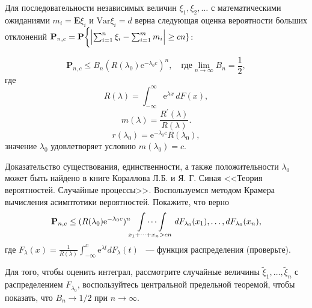 \begin{problem}
Для последовательности независимых величин $\xi_1,\xi_2,\dots$ с математическими ожиданиями $m_i = \mathbf{E} \xi_i$ и $\text{Var} \xi_i = d$ верна следующая оценка вероятности больших отклонений $\mathbf{P}_{n,c}= \mathbf{P}\biggl\{\Bigl|\sum_{i=1}^n\xi_i -\sum_{i=1}^m m_i\Bigr|\geq cn\}$: 

\begin{equation*}
\mathbf{P}_{n,c} \leq B_n(R(\lambda_0)\text{e}^{-\lambda_0c})^n,\quad\text{где} \lim_{n\to\infty}B_n=\frac{1}{2},
\end{equation*}
где 
\begin{equation*}
R(\lambda)=\int_{-\infty}^{\infty}\text{e}^{\lambda x}\,d F(x),
\end{equation*}
\begin{equation*}
m(\lambda) = \frac{R^{\prime}(\lambda)}{R(\lambda)}.
\end{equation*}
\begin{equation*}
r(\lambda_0) = \text{e}^{-\lambda_0 c}R(\lambda_0),
\end{equation*}
значение $\lambda_0$ удовлетворяет условию  $m(\lambda_0) = c$.
\end{problem}
\begin{remark}
Доказательство существования, единственности, а также положительности $\lambda_0$  может быть найдено в книге Кораллова Л.Б. и Я. Г. Синая <<Теория вероятностей. Случайные процессы>>. Воспользуемся методом Крамера вычисления асимптотики вероятностей. Покажите, что верно 
\begin{equation*}
\mathbf{P}_{n,c} \leq (R(\lambda_0)\text{e}^{-\lambda_0c})^n \idotsint\limits_{x_1+\dots+x_n>cn} \,dF_{\lambda_0}(x_1),\dots,dF_{\lambda_0}(x_n),
\end{equation*}
где $F_\lambda(x) = \frac{1}{R(\lambda)}\int_{-\infty}^{x} \text{e}^{\lambda t}d F_{\lambda}(t)$ ~--- функция распределения (проверьте).

Для того, чтобы оценить интеграл, рассмотрите случайные величины $\tilde{\xi}_1,\dots,\tilde{\xi}_n$ с распределением $F_{\lambda_0}$, воспользуйтесь центральной предельной теоремой, чтобы показать, что $B_n\to1/2$ при ${n\to\infty}$.
\end{remark}

\medskip 



